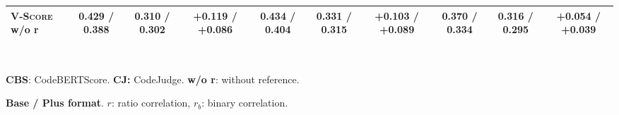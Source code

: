 \begin{table}[t]
\begin{tabular}{@{}
        l|ccc|ccc|ccc@{}}
        \textsc{V-Score} w/o r  & 0.429 / 0.388   & 0.310 / 0.302   & +0.119 / +0.086                     & 0.434 / 0.404   & 0.331 / 0.315   & +0.103 / +0.089                     & 0.370 / 0.334   & 0.316 / 0.295   & +0.054 / +0.039                     \\
        \bottomrule
    \end{tabular}\\
    \begin{description}[itemsep=-3pt,topsep=0pt]
        \item \textbf{CBS}: CodeBERTScore. \hspace{10pt}  \textbf{CJ:} CodeJudge. \hspace{10pt} \textbf{w/o r}: without reference.
        \item \textbf{Base / Plus format}. $r$: ratio correlation, $r_b$: binary correlation.
    \end{description}
\end{table}